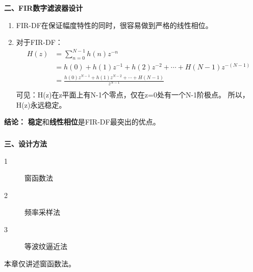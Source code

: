 \documentclass[notheorems,compress,mathserif,table]{beamer}
\begin{document}
\begin{frame}\frametitle{}%
\textbf{二、FIR数字滤波器设计}

  \begin{enumerate}
    \item
        FIR-DF在保证幅度特性的同时，很容易做到严格的线性相位。

    \item
        对于FIR-DF：
        \begin{equation*}
            \begin{split}
            H(z) &=\sum_{n=0}^{N-1}h(n)z^{-n}\\
                 &= h(0) + h(1)z^{-1} + h(2)z^{-2} +\cdots + H(N-1)z^{-(N-1)}\\
                 &= \frac{h(0)z^{N-1} + h(1)z^{N-2} +\cdots + H(N-1)}{z^{N-1}}\\
            \end{split}
        \end{equation*}
        可见：H(z)在z平面上有N-1个零点，仅在z=0处有一个N-1阶极点。
        所以，H(z)永远稳定。
  \end{enumerate}

  \textbf{结论：} \textbf{稳定}和\textbf{线性相位}是FIR-DF最突出的优点。

\end{frame}



\begin{frame}\frametitle{}%
\textbf{三、设计方法}

    \begin{description}
      \item[1] 窗函数法
      \item[2] 频率采样法
      \item[3] 等波纹逼近法
    \end{description}


    本章仅讲述窗函数法。
\end{frame}
\end{document}
